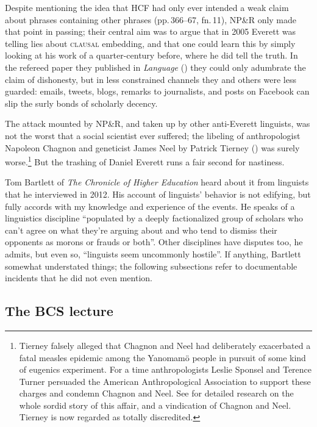\documentclass[output=paper,colorlinks,citecolor=brown
]{langscibook}
\begin{document}
Despite mentioning the idea that HCF had only ever intended a weak
claim about phrases containing other phrases (pp.\,366--67, fn.\,11),
NP\&R only made that point in passing; their central aim was to argue
that in 2005 Everett was telling lies about \textsc{clausal} embedding,
and that one could learn this by simply looking at his work of a
quarter-century before, where he did tell the truth. In the refereed
paper they published in \textit{Language} (\citeyear{NevPesRod09a})
they could only adumbrate the claim of dishonesty, but in less
constrained channels they and others were less guarded: emails, tweets,
blogs, remarks to journalists, and posts on Facebook can slip the
surly bonds of scholarly decency.

The attack mounted by NP\&R, and taken up by other anti-Everett
linguists, was not the worst that a social scientist ever suffered;
the libeling of anthropologist Napoleon Chagnon and geneticist James
Neel by Patrick Tierney (\citeyear{Tierney00}) was surely
worse.\footnote{\label{tierney}%
   Tierney falsely alleged that Chagnon and Neel had deliberately
   exacerbated a fatal measles epidemic among the Yanomam{\"o} people
   in pursuit of some kind of eugenics experiment. For a time
   anthropologists Leslie Sponsel and Terence Turner persuaded the
   American Anthropological Association to support these charges and
   condemn Chagnon and Neel. See \citet{Dreger11} for detailed
   research on the whole sordid story of this affair, and a vindication
   of Chagnon and Neel. Tierney is now regarded as totally discredited.}
But the trashing of Daniel Everett runs a fair second for nastiness.

Tom Bartlett of \textit{The Chronicle of Higher Education} heard
about it from linguists that he interviewed in 2012. His account of
linguists' behavior \citep{Bartlett12} is not edifying, but fully
accords with my knowledge and experience of the events. He speaks
of a linguistics discipline ``populated by a deeply factionalized
group of scholars who can't agree on what they're arguing about
and who tend to dismiss their opponents as morons or frauds or both''.
Other disciplines have disputes too, he admits, but even so,
``linguists seem uncommonly hostile''. If anything, Bartlett somewhat
understated things; the following subsections refer to documentable
incidents that he did not even mention.

\subsection{The BCS lecture}\label{river}
\end{document}
